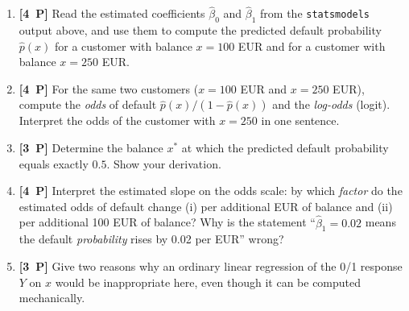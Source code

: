 \documentclass[11pt,a4paper]{article}
\newcommand{\pp}[1]{\textbf{[#1~P]}\enspace}
\begin{document}
\begin{enumerate}[label=(\alph*),leftmargin=7mm,itemsep=2.5mm]
  \item \pp{4} Read the estimated coefficients $\hat{\beta}_0$ and $\hat{\beta}_1$ from the
    \texttt{statsmodels} output above, and use them to compute the predicted default
    probability $\hat{p}(x)$ for a customer with balance $x=100$ EUR and for a customer with
    balance $x=250$ EUR.
  \item \pp{4} For the same two customers ($x=100$ EUR and $x=250$ EUR), compute the
    \emph{odds} of default $\hat{p}(x)/(1-\hat{p}(x))$ and the \emph{log-odds} (logit).
    Interpret the odds of the customer with $x=250$ in one sentence.
  \item \pp{3} Determine the balance $x^{*}$ at which the predicted default probability
    equals exactly $0.5$. Show your derivation.
  \item \pp{4} Interpret the estimated slope on the odds scale: by which \emph{factor} do the
    estimated odds of default change (i) per additional EUR of balance and (ii) per
    additional 100 EUR of balance? Why is the statement ``$\hat{\beta}_1=0.02$ means the
    default \emph{probability} rises by 0.02 per EUR'' wrong?
  \item \pp{3} Give two reasons why an ordinary linear regression of the 0/1 response $Y$
    on $x$ would be inappropriate here, even though it can be computed mechanically.
\end{enumerate}
\end{document}
